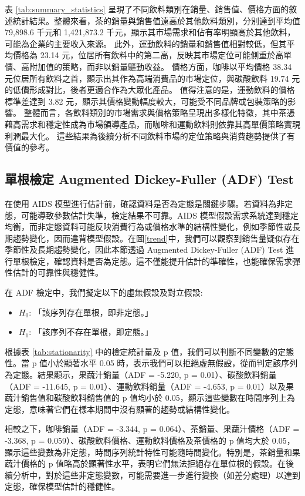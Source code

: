 表 \ref{tab:summary_statistics} 呈現了不同飲料類別在銷量、銷售值、價格方面的敘述統計結果。整體來看，茶的銷量與銷售值遠高於其他飲料類別，分別達到平均值 79,898.6 千元和 1,421,873.2 千元，顯示其市場需求和佔有率明顯高於其他飲料，可能為企業的主要收入來源。
此外，運動飲料的銷量和銷售值相對較低，但其平均價格為 23.14 元，位居所有飲料中的第二高，反映其市場定位可能側重於高單價、高附加值的策略，而非以銷量驅動收益。
價格方面，咖啡以平均價格 38.34 元位居所有飲料之首，顯示出其作為高端消費品的市場定位，與碳酸飲料 19.74 元的低價形成對比，後者更適合作為大眾化產品。
值得注意的是，運動飲料的價格標準差達到 3.82 元，顯示其價格變動幅度較大，可能受不同品牌或包裝策略的影響。
整體而言，各飲料類別的市場需求與價格策略呈現出多樣化特徵，其中茶憑藉高需求和穩定性成為市場領導產品，而咖啡和運動飲料則依靠其高單價策略實現利潤最大化。
這些結果為後續分析不同飲料市場的定位策略與消費趨勢提供了有價值的參考。


\subsection{單根檢定 Augmented Dickey-Fuller (ADF) Test}

在使用 AIDS 模型進行估計前，確認資料是否為定態是關鍵步驟。若資料為非定態，可能導致參數估計失準，檢定結果不可靠。AIDS 模型假設需求系統達到穩定均衡，而非定態資料可能反映消費行為或價格水準的結構性變化，例如季節性或長期趨勢變化，因而違背模型假設。在圖\ref{trend}中，我們可以觀察到銷售量疑似存在季節性及長期趨勢變化，因此本節透過 Augmented Dickey-Fuller (ADF) Test 進行單根檢定，確認資料是否為定態。這不僅能提升估計的準確性，也能確保需求彈性估計的可靠性與穩健性。

在 ADF 檢定中，我們擬定以下的虛無假設及對立假設:
\begin{itemize}
    \item \(H_0\): 「該序列存在單根，即非定態。」
    \item \(H_1\): 「該序列不存在單根，即定態。」
\end{itemize}
根據表 \ref{tab:stationarity} 中的檢定統計量及 p 值，我們可以判斷不同變數的定態性。當 p 值小於顯著水平 0.05 時，表示我們可以拒絕虛無假設，從而判定該序列為定態。結果顯示，果蔬汁銷量（ADF = -5.220, p = 0.01）、碳酸飲料銷量（ADF = -11.645, p = 0.01）、運動飲料銷量（ADF = -4.653, p = 0.01）以及果蔬汁銷售值和碳酸飲料銷售值的 p 值均小於 0.05，顯示這些變數在時間序列上為定態，意味著它們在樣本期間中沒有顯著的趨勢或結構性變化。

相較之下，咖啡銷量（ADF = -3.344, p = 0.064）、茶銷量、果蔬汁價格（ADF = -3.368, p = 0.059）、碳酸飲料價格、運動飲料價格及茶價格的 p 值均大於 0.05，顯示這些變數為非定態，時間序列統計特性可能隨時間變化。特別是，茶銷量和果蔬汁價格的 p 值略高於顯著性水平，表明它們無法拒絕存在單位根的假設。在後續分析中，對於這些非定態變數，可能需要進一步進行變換（如差分處理）以達到定態，確保模型估計的穩健性。